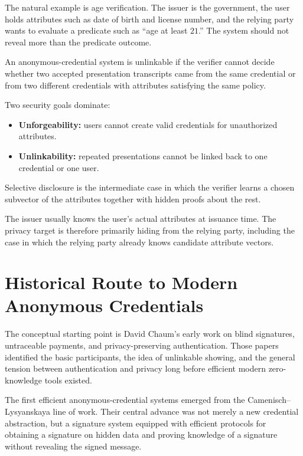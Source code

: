 \documentclass[11pt]{article}
\begin{document}
The natural example is age verification.  The issuer is the government, the
user holds attributes such as date of birth and license number, and the
relying party wants to evaluate a predicate such as ``age at least $21$.''  The
system should not reveal more than the predicate outcome.

\begin{definition}[Unlinkability]
An anonymous-credential system is unlinkable if the verifier cannot decide
whether two accepted presentation transcripts came from the same credential or
from two different credentials with attributes satisfying the same policy.
\end{definition}

Two security goals dominate:
\begin{itemize}
  \item \textbf{Unforgeability:} users cannot create valid credentials for
        unauthorized attributes.
  \item \textbf{Unlinkability:} repeated presentations cannot be linked back to
        one credential or one user.
\end{itemize}

Selective disclosure is the intermediate case in which the verifier learns a
chosen subvector of the attributes together with hidden proofs about the rest.

\begin{remark}
The issuer usually knows the user's actual attributes at issuance time.  The
privacy target is therefore primarily hiding from the relying party, including
the case in which the relying party already knows candidate attribute vectors.
\end{remark}

\section{Historical Route to Modern Anonymous Credentials}

The conceptual starting point is David Chaum's early work on blind signatures,
untraceable payments, and privacy-preserving authentication.  Those papers
identified the basic participants, the idea of unlinkable showing, and the
general tension between authentication and privacy long before efficient modern
zero-knowledge tools existed.

The first efficient anonymous-credential systems emerged from the
Camenisch--Lysyanskaya line of work.  Their central advance was not merely a
new credential abstraction, but a signature system equipped with efficient
protocols for obtaining a signature on hidden data and proving knowledge of a
signature without revealing the signed message.
\end{document}
